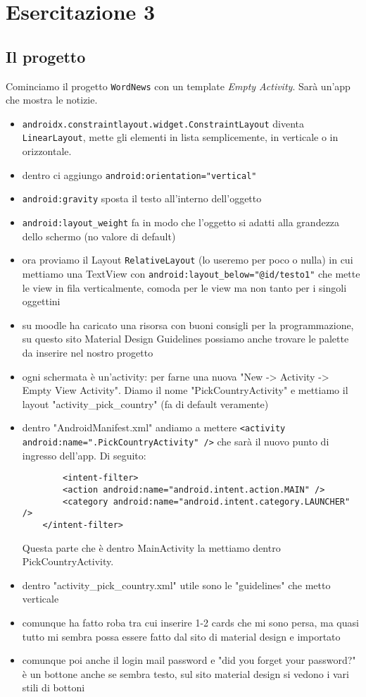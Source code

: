 
\chapter{Esercitazione 3}
\section{Il progetto}
Cominciamo il progetto \texttt{WordNews} con un template \textit{Empty Activity}. Sarà un'app che mostra le notizie.

\begin{itemize}
    \item \texttt{androidx.constraintlayout.widget.ConstraintLayout} diventa \texttt{LinearLayout}, mette gli elementi in lista semplicemente, in verticale o in orizzontale.
    \item dentro ci aggiungo \texttt{android:orientation="vertical"}
    \item \texttt{android:gravity} sposta il testo all'interno dell'oggetto
    \item \texttt{android:layout_weight} fa in modo che l'oggetto si adatti alla grandezza dello schermo (no valore di default)
    \item ora proviamo il Layout \texttt{RelativeLayout} (lo useremo per poco o nulla) in cui mettiamo una TextView con \texttt{android:layout\_below="@id/testo1"} che mette le view in fila verticalmente, comoda per le view ma non tanto per i singoli oggettini
    \item su moodle ha caricato una risorsa con buoni consigli per la programmazione, su questo sito Material Design Guidelines possiamo anche trovare le palette da inserire nel nostro progetto
    \item ogni schermata è un'activity: per farne una nuova "New -> Activity -> Empty View Activity". Diamo il nome "PickCountryActivity" e mettiamo il layout "activity\_pick\_country" (fa di default veramente)
    \item dentro "AndroidManifest.xml" andiamo a mettere \texttt{<activity android:name=".PickCountryActivity" />} che sarà il nuovo punto di ingresso dell'app. Di seguito:
    \begin{verbatim}        
        <intent-filter>
        <action android:name="android.intent.action.MAIN" />
        <category android:name="android.intent.category.LAUNCHER" />
    </intent-filter> 
    \end{verbatim}
    Questa parte che è dentro MainActivity la mettiamo dentro PickCountryActivity.
    \item dentro "activity\_pick\_country.xml" utile sono le "guidelines" che metto verticale
    \item comunque ha fatto roba tra cui inserire 1-2 cards che mi sono persa, ma quasi tutto mi sembra possa essere fatto dal sito di material design e importato
    \item comunque poi anche il login mail password e "did you forget your password?" è un bottone anche se sembra testo, sul sito material design si vedono i vari stili di bottoni 
\end{itemize}
